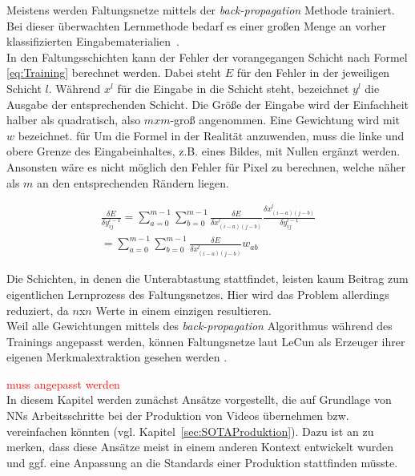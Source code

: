 \documentclass[times, 12pt,twocolumn]{article}
\begin{document}
 \label{sec:Training}
Meistens werden Faltungsnetze mittels der \textit{back-propagation} Methode trainiert. Bei dieser überwachten Lernmethode bedarf es einer großen Menge an vorher klassifizierten Eingabematerialien~\cite{5537907}. \\
In den Faltungsschichten kann der Fehler der vorangegangen Schicht nach Formel \ref{eq:Training} berechnet werden. Dabei steht $E$ für den Fehler in der jeweiligen Schicht $l$. Während $x^l$ für die Eingabe in die Schicht steht, bezeichnet $y^l$ die Ausgabe der entsprechenden Schicht. Die Größe der Eingabe wird der Einfachheit halber als quadratisch, also $mxm$-groß angenommen. Eine Gewichtung wird mit $w$ bezeichnet. für Um die Formel in der Realität anzuwenden, muss die linke und obere Grenze des Eingabeinhaltes, z.B. eines Bildes, mit Nullen ergänzt werden. Ansonsten wäre es nicht möglich den Fehler für Pixel zu berechnen, welche näher als $m$ an den entsprechenden Rändern liegen. 

\footnotesize
\begin{equation}
\begin{aligned}
\frac{\delta E}{\delta y_{ij}^{l-1}} = \sum_{a=0}^{m-1} \sum_{b=0}^{m-1} \frac{\delta E}{\delta x_{(i-a)(j-b)}^{l}} \frac{\delta x_{(i-a)(j-b)}^{l}}{\delta y_{ij}^{l-1}}  \\
= \sum \limits_{a=0}^{m-1} \sum \limits_{b=0}^{m-1} \frac{\delta E}{\delta x_{(i-a)(j-b)}^{l}} w_{ab}
\end{aligned}
	\label{eq:Training}
\end{equation}
\small

Die Schichten, in denen die Unterabtastung stattfindet, leisten kaum Beitrag zum eigentlichen Lernprozess des Faltungsnetzes. Hier wird das Problem allerdings reduziert, da $n$x$n$ Werte in einem einzigen resultieren. \\
Weil alle Gewichtungen mittels des \textit{back-propagation} Algorithmus während des Trainings angepasst werden, können Faltungsnetze laut LeCun als Erzeuger ihrer eigenen Merkmalextraktion gesehen werden \cite{LeCun:1998:CNI:303568.303704}.








 \label{sec:Vorverarbeitung}
 \label{sec:SOTAVorverarbeitung}

 \label{sec:Produktion}
\textcolor{red}{muss angepasst werden} \\
In diesem Kapitel werden zunächst Ansätze vorgestellt, die auf Grundlage von NNs Arbeitsschritte bei der Produktion von Videos übernehmen bzw. vereinfachen könnten (vgl. Kapitel~\ref{sec:SOTAProduktion}). Dazu ist an zu merken, dass diese Ansätze meist in einem anderen Kontext entwickelt wurden und ggf. eine Anpassung an die Standards einer Produktion stattfinden müsste. \\
\end{document}
